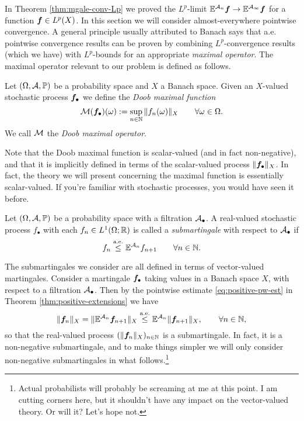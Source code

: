 In Theorem \ref{thm:mgale-conv-Lp} we proved the $L^p$-limit $\mathbb{E}^{\mathcal{A}_{n}} \bm{f} \to \mathbb{E}^{\mathcal{A}_{\infty}} \bm{f}$ for a function $\bm{f} \in L^p(X)$.
In this section we will consider almost-everywhere pointwise convergence.
A general principle usually attributed to Banach says that a.e. pointwise convergence results can be proven by combining $L^p$-convergence results (which we have) with $L^p$-bounds for an appropriate \emph{maximal operator}.
The maximal operator relevant to our problem is defined as follows.

\begin{defn}
  Let $(\Omega,\mathcal{A},\mathbb{P})$ be a probability space and $X$ a Banach space.
  Given an $X$-valued stochastic process $\bm{f}_{\bullet}$ we define the \emph{Doob maximal function}
  \begin{equation*}
    \mathcal{M}(\bm{f}_{\bullet})(\omega) := \sup_{n \in \mathbb{N}} \|f_{n}(\omega)\|_{X} \qquad \forall \omega \in \Omega.
  \end{equation*}
  We call $\mathcal{M}$ the \emph{Doob maximal operator}.
\end{defn}

Note that the Doob maximal function is scalar-valued (and in fact non-negative), and that it is implicitly defined in terms of the scalar-valued process $\|\bm{f}_{\bullet}\|_{X}$.
In fact, the theory we will present concerning the maximal function is essentially scalar-valued.
If you're familiar with stochastic processes, you would have seen it before.

\begin{defn}
  Let $(\Omega, \mathcal{A}, \mathbb{P})$ be a probability space with a filtration $\mathcal{A}_{\bullet}$.
  A real-valued stochastic process $f_{\bullet}$ with each $f_n \in L^1(\Omega; \mathbb{R})$ is called a \emph{submartingale} with respect to $\mathcal{A}_{\bullet}$ if 
  \begin{equation}\label{eq:mgale-defining-property}
    f_n \stackrel{\mathrm{a.e.}}{\leq} \mathbb{E}^{\mathcal{A}_n} f_{n+1} \qquad \forall n \in \mathbb{N}.
  \end{equation}
\end{defn}

The submartingales we consider are all defined in terms of vector-valued martingales.
Consider a martingale $\bm{f}_{\bullet}$ taking values in a Banach space $X$, with respect to a filtration $\mathcal{A}_{\bullet}$.
Then by the pointwise estimate \eqref{eq:positive-pw-est} in Theorem \ref{thm:positive-extensions} we have
\begin{equation*}
  \|\bm{f}_n\|_X = \|\mathbb{E}^{\mathcal{A}_n} \bm{f}_{n+1}\|_X \stackrel{\mathrm{a.e.}}{\leq} \mathbb{E}^{\mathcal{A}_n} \|\bm{f}_{n+1}\|_X, \qquad \forall n \in \mathbb{N},
\end{equation*}
so that the real-valued process $(\|\bm{f}_{n}\|_X)_{n \in \mathbb{N}}$ is a submartingale.
In fact, it is a non-negative submartingale, and to make things simpler we will only consider non-negative submartingales in what follows.\footnote{Actual probabilists will probably be screaming at me at this point. I am cutting corners here, but it shouldn't have any impact on the vector-valued theory. Or will it? Let's hope not. }

